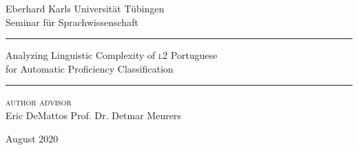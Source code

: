 
\thispagestyle{empty} %

\begin{center}
\noindent
\vspace{\fill}

Eberhard Karls Universität Tübingen\\
Seminar für Sprachwissenschaft

\vspace{\fill}


\hrule
\vspace{1em}
{\Large Analyzing Linguistic Complexity of {\scshape l2} Portuguese \\
\vspace{0.25em}
for Automatic Proficiency Classification}
\vspace{1em}
\hrule

\vspace{\fill}

\begin{flushleft}
{\scshape author} \hfill {\scshape advisor}\\
Eric DeMattos \hfill Prof. Dr. Detmar Meurers
\end{flushleft}

\vspace{\fill}

August 2020

\end{center}

\clearpage
